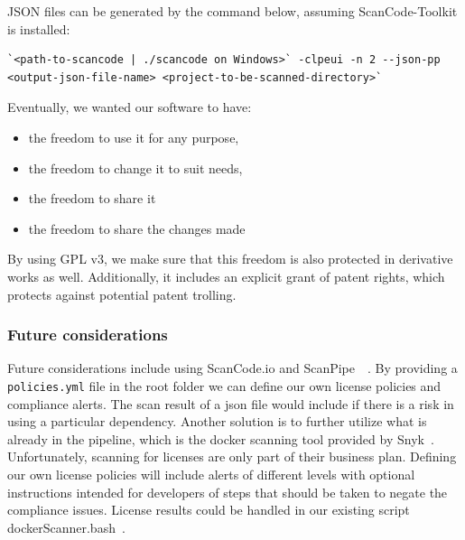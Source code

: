 JSON files can be generated by the command below, assuming ScanCode-Toolkit is installed: \\

\begin{verbatim}
`<path-to-scancode | ./scancode on Windows>` -clpeui -n 2 --json-pp 
<output-json-file-name> <project-to-be-scanned-directory>`
\end{verbatim}

\vspace{3mm}

Eventually, we wanted our software to have:

\begin{itemize}[noitemsep]
    \item the freedom to use it for any purpose,
    \item the freedom to change it to suit needs,
    \item the freedom to share it
    \item the freedom to share the changes made
\end{itemize}

By using GPL v3, we make sure that this freedom is also protected in derivative works as well. Additionally, it includes an explicit grant of patent rights, which protects against potential patent trolling.

\subsubsection*{Future considerations}
Future considerations include using ScanCode.io and ScanPipe~\cite{scanCodeIO}~\cite{ScanPipe}. By providing a \texttt{policies.yml} file in the root folder we can define our own license policies and compliance alerts. The scan result of a json file would include if there is a risk in using a particular dependency. Another solution is to further utilize what is already in the pipeline, which is the docker scanning tool provided by Snyk~\cite{snyk}. Unfortunately, scanning for licenses are only part of their business plan. Defining our own license policies will include alerts of different levels with optional instructions intended for developers of steps that should be taken to negate the compliance issues. License results could be handled in our existing script dockerScanner.bash~\cite{dockerScanner}.